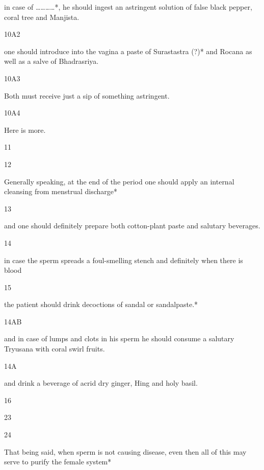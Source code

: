 \begin{translation}
\begin{tt}
in case of …………*, he should ingest an astringent solution of false 
  black pepper, coral tree and Manjista.
  
\item[10A2]

one should introduce into the vagina a paste of Surastastra (?)* and 
  Rocana as well as  a salve of Bhadrasriya.
  
\item[10A3]

Both must receive just a sip of something astringent.
  
\item[10A4]

Here is more.
  
\item[11]


  
\item[12]

Generally speaking, at the end of the period one should apply an internal 
  cleansing from menstrual discharge*
  
  
\item[13]

and one should definitely prepare both cotton-plant paste and salutary 
  beverages.
  
\item[14]

in case the sperm spreads a foul-smelling stench and definitely when 
  there is blood
  
\item[15]

the patient should drink decoctions of sandal or sandalpaste.*
  
\item[14AB]

and in case of lumps and clots in his sperm he should consume a 
  salutary Tryusana with coral swirl fruits.
  
\item[14A]

and drink a beverage of acrid dry ginger, Hing and holy basil.
  
\item[16]


\item[23]


  
\item[24]

That being said, when sperm is not causing disease, even then all of this 
  may serve to purify the female system*
  

\end{tt}
\end{translation}
